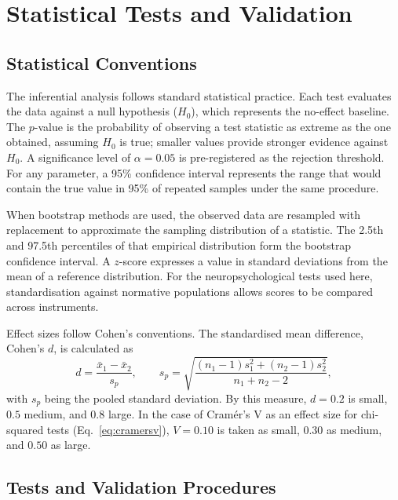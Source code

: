 
\section{Statistical Tests and Validation}\label{sec:stats}

\subsection{Statistical Conventions}

The inferential analysis follows standard statistical practice. Each test evaluates the data against a null hypothesis ($H_0$), which represents the no-effect baseline. The $p$-value is the probability of observing a test statistic as extreme as the one obtained, assuming $H_0$ is true; smaller values provide stronger evidence against $H_0$. A significance level of $\alpha = 0.05$ is pre-registered as the rejection threshold. For any parameter, a 95\% confidence interval represents the range that would contain the true value in 95\% of repeated samples under the same procedure.

When bootstrap methods are used, the observed data are resampled with replacement to approximate the sampling distribution of a statistic. The 2.5th and 97.5th percentiles of that empirical distribution form the bootstrap confidence interval. A $z$-score expresses a value in standard deviations from the mean of a reference distribution. For the neuropsychological tests used here, standardisation against normative populations allows scores to be compared across instruments.

Effect sizes follow Cohen's conventions. The standardised mean difference, Cohen's $d$, is calculated as
\begin{equation}\label{eq:cohend}
d=\frac{\bar{x}_1-\bar{x}_2}{s_p},\qquad s_p=\sqrt{\frac{(n_1-1)s_1^2+(n_2-1)s_2^2}{n_1+n_2-2}},
\end{equation}
with $s_p$ being the pooled standard deviation. By this measure, $d=0.2$ is small, $0.5$ medium, and $0.8$ large. In the case of Cram\'{e}r's V as an effect size for chi-squared tests (Eq.~\ref{eq:cramersv}), $V = 0.10$ is taken as small, $0.30$ as medium, and $0.50$ as large.

\subsection{Tests and Validation Procedures}

